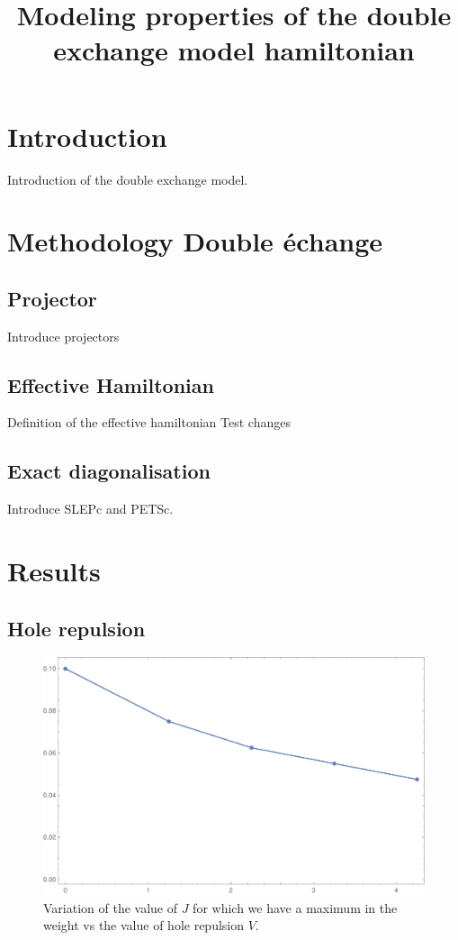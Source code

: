 \documentclass[ openright,titlepage,numbers=noenddot,headinclude,twoside,%
                footinclude=true,cleardoublepage=empty,abstractoff,%
                BCOR=5mm,paper=a4,fontsize=11pt,%
                ngerman,american,%
]{scrreprt}
\title{Modeling properties of the double exchange model hamiltonian}
\begin{document}
\maketitle
\thispagestyle{fancy}
\section{Introduction}

Introduction of the double exchange model.

\section{Methodology Double échange}

\subsection{Projector}

Introduce projectors

\subsection{Effective Hamiltonian}

Definition of the effective hamiltonian
Test changes

\subsection{Exact diagonalisation}

Introduce SLEPc and PETSc.

\section{Results}

\subsection{Hole repulsion}

\begin{figure}[ht]
    \centering
    \includegraphics[scale=0.5]{12_4h_J_wmax_vs_xrep.pdf}
    \caption{\label{fig:}Variation of the value of $J$ for which we have a maximum in the weight vs the value of hole repulsion $V$. }
\end{figure}
\end{document}
